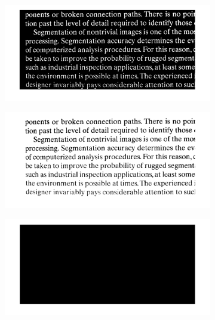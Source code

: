 \begin{figure}[h!]
	\centering
	\begin{subfigure}[b]{0.45\linewidth}
		\includegraphics[width=\linewidth]{myfigure/p8/fig0929(a).png}
		\caption{}
		\label{fig:0931a}
	\end{subfigure}
	\begin{subfigure}[b]{0.45\linewidth}
    	\includegraphics[width=\linewidth]{myfigure/p8/fig0931(b).png}
    	\caption{}
    	\label{fig:0931b}
  	\end{subfigure}
  	\begin{subfigure}[b]{0.45\linewidth}
		\includegraphics[width=\linewidth]{myfigure/p8/fig0931(c).png}
		\caption{}
		\label{fig:0931c}
	\end{subfigure}

\end{figure}
